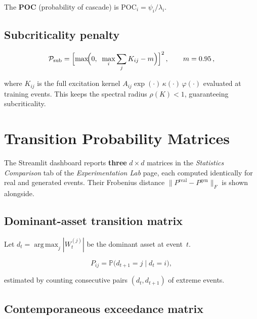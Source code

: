 \documentclass[11pt,a4paper]{article}
\newcommand{\Prob}{\mathbb{P}}
\DeclareMathOperator*{\argmax}{arg\,max}
\begin{document}
The \textbf{POC} (probability of cascade) is $\text{POC}_i = \psi_i / \lambda_i$.

\subsection{Subcriticality penalty}

\begin{equation}\label{eq:subcrit}
  \mathcal{P}_{\text{sub}}
  = \Bigl[\max\!\Bigl(0,\;\; \max_{i}\sum_{j} K_{ij} - m\Bigr)\Bigr]^{2}\,,
  \qquad m = 0.95\,,
\end{equation}

where $K_{ij}$ is the full excitation kernel
$A_{ij}\exp(\cdot)\,\kappa(\cdot)\,\varphi(\cdot)$
evaluated at training events.
This keeps the spectral radius $\rho(K) < 1$,
guaranteeing subcriticality.

\section{Transition Probability Matrices}\label{sec:transition}

The Streamlit dashboard reports \textbf{three} $d \times d$ matrices
in the \emph{Statistics Comparison} tab of the \emph{Experimentation Lab} page,
each computed identically for real and generated events.
Their Frobenius distance
$\|P^{\text{real}} - P^{\text{gen}}\|_F$ is shown alongside.

\subsection{Dominant-asset transition matrix}

Let $d_t = \argmax_j |W_t^{(j)}|$ be the dominant asset at event~$t$.

\begin{equation}\label{eq:trans}
  P_{ij}
  = \Prob\!\bigl(d_{t+1} = j \;\big|\; d_t = i\bigr),
\end{equation}

estimated by counting consecutive pairs $(d_t, d_{t+1})$ of extreme events.

\subsection{Contemporaneous exceedance matrix}
\end{document}

